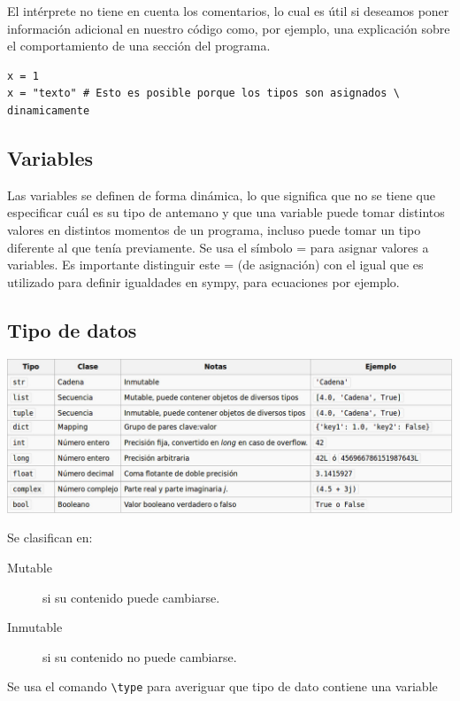 El intérprete no tiene en cuenta los comentarios, lo cual es útil si deseamos poner información adicional en nuestro código como, por ejemplo, una explicación sobre el comportamiento de una sección del programa.






\begin{lstlisting}
x = 1
x = "texto" # Esto es posible porque los tipos son asignados \
dinamicamente
\end{lstlisting}



\subsection{Variables}
Las variables se definen de forma dinámica, lo que significa que no se tiene que especificar cuál es su tipo de antemano y que una variable puede tomar distintos valores en distintos momentos de un programa, incluso puede tomar
 un tipo diferente al que tenía previamente. Se usa el símbolo = para asignar valores a variables. Es importante distinguir este = (de asignación) con el igual que es utilizado para definir igualdades en sympy, para ecuaciones por ejemplo.




\subsection{Tipo de datos}

\includegraphics[scale=.4]{imagenes/tipo_datos.jpg}

Se clasifican en:
\begin{description}
 \item[Mutable] si su contenido puede cambiarse.
 \item[Inmutable] si su contenido no puede cambiarse.
\end{description}

Se usa el comando \verb~\type~ para averiguar que tipo de dato contiene una variable

